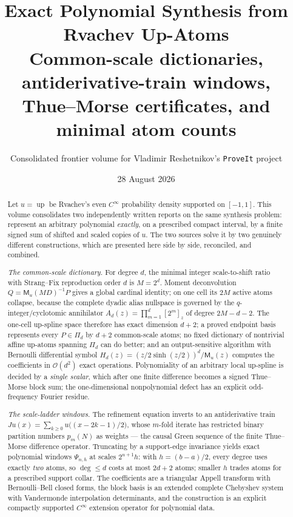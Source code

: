 \documentclass[11pt,oneside]{article}
\title{\bfseries Exact Polynomial Synthesis from Rvachev Up-Atoms\\[0.4em]
\large Common-scale dictionaries, antiderivative-train windows,\\
Thue--Morse certificates, and minimal atom counts}
\author{Consolidated frontier volume for Vladimir Reshetnikov's \texttt{ProveIt} project}
\date{28 August 2026}
\numberwithin{equation}{section}
\theoremstyle{definition}
\theoremstyle{remark}
\newcommand{\Up}{\operatorname{up}}
\newcommand{\bigO}{\mathcal O}
\newcommand{\MM}{\mathsf M}
\newcommand{\PiD}{\Pi_d}
\begin{document}
\maketitle

\begin{abstract}
\noindent
Let $u=\Up$ be Rvachev's even $C^\infty$ probability density supported
on $[-1,1]$.  This volume consolidates two independently written
reports on the same synthesis problem: represent an arbitrary
polynomial \emph{exactly}, on a prescribed compact interval, by a
finite signed sum of shifted and scaled copies of $u$.  The two
sources solve it by two genuinely different constructions, which are
presented here side by side, reconciled, and combined.

\emph{The common-scale dictionary.}  For degree $d$, the minimal
integer scale-to-shift ratio with Strang--Fix reproduction order $d$
is $M=2^{d}$.  Moment deconvolution
$Q=\MM_u(MD)^{-1}P$ gives a global cardinal identity; on one cell its
$2M$ active atoms collapse, because the complete dyadic alias
nullspace is governed by the $q$-integer/cyclotomic annihilator
$A_d(z)=\prod_{m=1}^{d}[2^{m}]_z$ of degree $2M-d-2$.  The one-cell
up-spline space therefore has exact dimension $d+2$; a proved endpoint
basis represents every $P\in\PiD$ by $d+2$ common-scale atoms; no
fixed dictionary of nontrivial affine up-atoms spanning $\PiD$ can do
better; and an output-sensitive algorithm with Bernoulli differential
symbol $H_d(z)=(z/2\sinh(z/2))^{d}/\MM_u(z)$ computes the coefficients
in $\bigO(d^{2})$ exact operations.  Polynomiality of an arbitrary
local up-spline is decided by a \emph{single scalar}, which after one
finite difference becomes a signed Thue--Morse block sum; the
one-dimensional nonpolynomial defect has an explicit odd-frequency
Fourier residue.

\emph{The scale-ladder windows.}  The refinement equation inverts to
an antiderivative train
$Ju(x)=\sum_{k\ge0}u\bigl((x-2k-1)/2\bigr)$, whose $m$-fold iterate
has restricted binary partition numbers $p_m(N)$ as weights --- the
causal Green sequence of the finite Thue--Morse difference operator.
Truncating by a support-edge invariance yields exact polynomial
windows $\Psi_{n,h}$ at scales $2^{n+1}h$: with $h=(b-a)/2$, every
degree uses exactly \emph{two} atoms, so $\deg\le d$ costs at most
$2d+2$ atoms; smaller $h$ trades atoms for a prescribed support
collar.  The coefficients are a triangular Appell transform with
Bernoulli--Bell closed forms, the block basis is an extended complete
Chebyshev system with Vandermonde interpolation determinants, and the
construction is an explicit compactly supported $C^\infty$ extension
operator for polynomial data.


\end{abstract}
\end{document}

